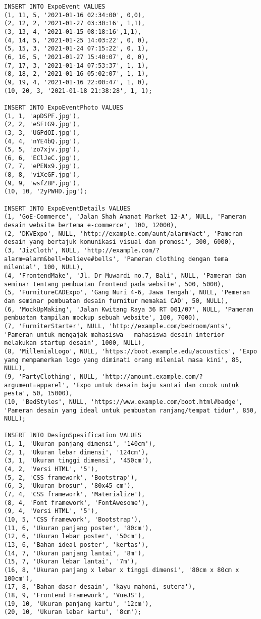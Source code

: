 \begin{lstlisting}
INSERT INTO ExpoEvent VALUES
(1, 11, 5, '2021-01-16 02:34:00', 0,0),
(2, 12, 2, '2021-01-27 03:30:16', 1,1),
(3, 13, 4, '2021-01-15 08:18:16',1,1),
(4, 14, 5, '2021-01-25 14:03:22', 0, 0),
(5, 15, 3, '2021-01-24 07:15:22', 0, 1),
(6, 16, 5, '2021-01-27 15:40:07', 0, 0),
(7, 17, 3, '2021-01-14 07:53:37', 1, 1),
(8, 18, 2, '2021-01-16 05:02:07', 1, 1),
(9, 19, 4, '2021-01-16 22:00:47', 1, 0),
(10, 20, 3, '2021-01-18 21:38:28', 1, 1);

INSERT INTO ExpoEventPhoto VALUES
(1, 1, 'apDSPF.jpg'),
(2, 2, 'eSFtG9.jpg'),
(3, 3, 'UGPdOI.jpg'),
(4, 4, 'nYE4bQ.jpg'),
(5, 5, 'zo7xjv.jpg'),
(6, 6, 'EClJeC.jpg'),
(7, 7, 'ePENx9.jpg'),
(8, 8, 'viXcGF.jpg'),
(9, 9, 'wsfZBP.jpg'),
(10, 10, '2yPWHD.jpg');

INSERT INTO ExpoEventDetails VALUES
(1, 'GoE-Commerce', 'Jalan Shah Amanat Market 12-A', NULL, 'Pameran desain website bertema e-commerce', 100, 12000),
(2, 'DKVExpo', NULL, 'http://example.com/aunt/alarm#act', 'Pameran desain yang bertajuk komunikasi visual dan promosi', 300, 6000),
(3, 'JizCloth', NULL, 'http://example.com/?alarm=alarm&bell=believe#bells', 'Pameran clothing dengan tema milenial', 100, NULL),
(4, 'FrontendMake', 'Jl. Dr Muwardi no.7, Bali', NULL, 'Pameran dan seminar tentang pembuatan frontend pada website', 500, 5000),
(5, 'FurnitureCADExpo', 'Gang Nuri 4-6, Jawa Tengah', NULL, 'Pemeran dan seminar pembuatan desain furnitur memakai CAD', 50, NULL),
(6, 'MockUpMaking', 'Jalan Kwitang Raya 36 RT 001/07', NULL, 'Pameran pembuatan tampilan mockup sebuah website', 100, 7000),
(7, 'FurniterStarter', NULL, 'http://example.com/bedroom/ants', 'Pameran untuk mengajak mahasiswa - mahasiswa desain interior melakukan startup desain', 1000, NULL),
(8, 'MillenialLogo', NULL, 'https://boot.example.edu/acoustics', 'Expo yang mempamerkan logo yang diminati orang milenial masa kini', 85, NULL),
(9, 'PartyClothing', NULL, 'http://amount.example.com/?argument=apparel', 'Expo untuk desain baju santai dan cocok untuk pesta', 50, 15000),
(10, 'BedStyles', NULL, 'https://www.example.com/boot.html#badge', 'Pameran desain yang ideal untuk pembuatan ranjang/tempat tidur', 850, NULL);

INSERT INTO DesignSpesification VALUES
(1, 1, 'Ukuran panjang dimensi', '140cm'),
(2, 1, 'Ukuran lebar dimensi', '124cm'),
(3, 1, 'Ukuran tinggi dimensi', '450cm'),
(4, 2, 'Versi HTML', '5'),
(5, 2, 'CSS framework', 'Bootstrap'),
(6, 3, 'Ukuran brosur', '80x45 cm'),
(7, 4, 'CSS framework', 'Materialize'),
(8, 4, 'Font framework', 'FontAwesome'),
(9, 4, 'Versi HTML', '5'),
(10, 5, 'CSS framework', 'Bootstrap'),
(11, 6, 'Ukuran panjang poster', '80cm'),
(12, 6, 'Ukuran lebar poster', '50cm'),
(13, 6, 'Bahan ideal poster', 'kertas'),
(14, 7, 'Ukuran panjang lantai', '8m'),
(15, 7, 'Ukuran lebar lantai', '7m'),
(16, 8, 'Ukuran panjang x lebar x tinggi dimensi', '80cm x 80cm x 100cm'),
(17, 8, 'Bahan dasar desain', 'kayu mahoni, sutera'),
(18, 9, 'Frontend Framework', 'VueJS'),
(19, 10, 'Ukuran panjang kartu', '12cm'),
(20, 10, 'Ukuran lebar kartu', '8cm');


\end{lstlisting}
